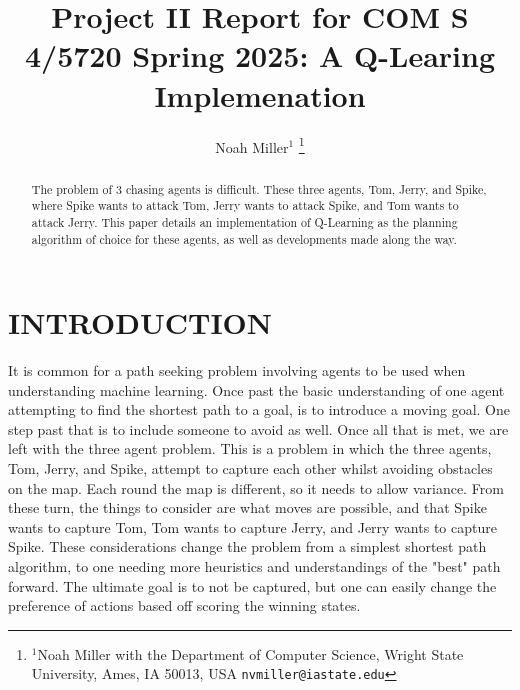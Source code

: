 \documentclass[letterpaper, 10 pt, conference]{ieeeconf}   %
\title{\LARGE \bf
Project II Report for COM S 4/5720 Spring 2025: A Q-Learing Implemenation
}
\author{Noah Miller$^{1}$%
\thanks{$^{1}$Noah Miller with the Department of Computer Science, Wright State University,
        Ames, IA 50013, USA
        {\tt\small nvmiller@iastate.edu}}%
}
\begin{document}
\maketitle
\thispagestyle{empty}
\pagestyle{empty}


\begin{abstract}

	The problem of 3 chasing agents is difficult. These three agents, Tom, Jerry, and Spike, where Spike wants to attack Tom, Jerry wants to attack Spike, and Tom wants to attack Jerry.
	This paper details an implementation of Q-Learning as the planning algorithm of choice for these agents, as well as developments made along the way.

\end{abstract}




\section{INTRODUCTION}

It is common for a path seeking problem involving agents to be used when understanding machine learning. Once past the basic understanding of one agent attempting
to find the shortest path to a goal, is to introduce a moving goal. One step past that is to include someone to avoid as well. Once all that is met, we are left with the three agent problem. This
is a problem in which the three agents, Tom, Jerry, and Spike, attempt to capture each other whilst avoiding obstacles on the map. Each round the map is different, so it needs to allow variance.
From these turn, the things to consider are what moves are possible, and that Spike wants to capture Tom, Tom wants to capture Jerry, and Jerry wants to capture Spike. These considerations
change the problem from a simplest shortest path algorithm, to one needing more heuristics and understandings of the "best" path forward. The ultimate goal is to not be captured,
but one can easily change the preference of actions based off scoring the winning states.
\end{document}
